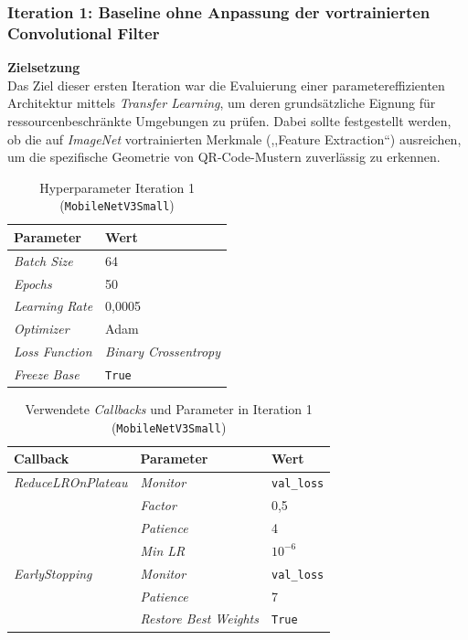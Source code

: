 \documentclass[
    a4paper,        %
    11pt,           %
    ngerman,        %
    parskip=half,   %
    listof=totoc,   %
    bibliography=totoc %
]{scrartcl}
\begin{document}
\subsubsection{Iteration 1: Baseline ohne Anpassung der vortrainierten Convolutional Filter}

\textbf{Zielsetzung} \\
Das Ziel dieser ersten Iteration war die Evaluierung einer parametereffizienten Architektur mittels \textit{Transfer Learning}, um deren grundsätzliche Eignung für ressourcenbeschränkte Umgebungen zu prüfen. Dabei sollte festgestellt werden, ob die auf \textit{ImageNet} vortrainierten Merkmale (,,Feature Extraction``) ausreichen, um die spezifische Geometrie von QR-Code-Mustern zuverlässig zu erkennen.

\begin{table}[H]
    \centering
    \caption{Hyperparameter Iteration 1 (\texttt{MobileNetV3Small})}
    \label{tab:mnetv3s_hyperparams_iter1}
    \begin{tabular}{ll}
        \toprule
        \textbf{Parameter} & \textbf{Wert} \\
        \midrule
        \textit{Batch Size} & 64 \\
        \textit{Epochs} & 50 \\
        \textit{Learning Rate} & 0,0005 \\
        \textit{Optimizer} & Adam \\
        \textit{Loss Function} & \textit{Binary Crossentropy} \\
        \textit{Freeze Base} & \texttt{True} \\
        \bottomrule
    \end{tabular}
\end{table}

\begin{table}[H]
    \centering
    \caption{Verwendete \textit{Callbacks} und Parameter in Iteration 1 (\texttt{MobileNetV3Small})}
    \label{tab:mnetv3s_callbacks_iter1}
    \begin{tabular}{lll}
        \toprule
        \textbf{Callback} & \textbf{Parameter} & \textbf{Wert} \\
        \midrule
        \textit{ReduceLROnPlateau} & \textit{Monitor} & \texttt{val\_loss} \\
                          & \textit{Factor} & 0,5 \\
                          & \textit{Patience} & 4 \\
                          & \textit{Min LR} & $10^{-6}$ \\
        \midrule
        \textit{EarlyStopping}     & \textit{Monitor} & \texttt{val\_loss} \\
                          & \textit{Patience} & 7 \\
                          & \textit{Restore Best Weights} & \texttt{True} \\
        \bottomrule
    \end{tabular}
\end{table}
\end{document}
